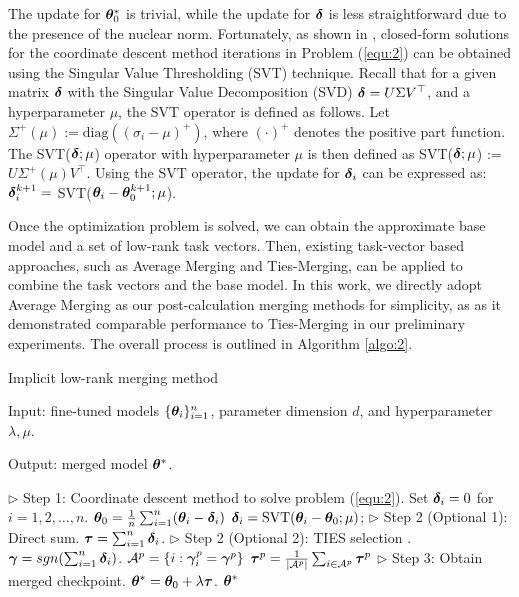 The update for $\bm{\theta}_0^*$ is trivial, while the update for $\bm{\delta}$ is less straightforward due to the presence of the nuclear norm.
Fortunately, as shown in \citet{cai_2010_singular}, closed-form solutions for the coordinate descent method iterations in Problem (\ref{equ:2}) can be obtained using the Singular Value Thresholding (SVT) technique.
Recall that for a given matrix $\bm{\delta}$ with the Singular Value Decomposition (SVD) $\bm{\delta} = U \Sigma V^\top$, and a hyperparameter $\mu$, the SVT operator is defined as follows.
Let $\Sigma^+(\mu) := \text{diag}((\sigma_i - \mu)^+)$, where $(\cdot)^+$ denotes the positive part function. The SVT($\bm{\delta}; \mu$) operator with hyperparameter $\mu$ is then defined as SVT($\bm{\delta}; \mu$) := $U \Sigma^+ (\mu) V^\top$.
Using the SVT operator, the update for $\bm{\delta}_i$ can be expressed as:
$\bm{\delta}_i^{k+1} = $ SVT($\bm{\theta}_i - \bm{\theta}_0^{k+1}; \mu$).

Once the optimization problem is solved, we can obtain the approximate base model and a set of low-rank task vectors. Then, existing task-vector based approaches, such as Average Merging and Ties-Merging, can be applied to combine the task vectors and the base model. In this work, we directly adopt Average Merging as our post-calculation merging methods for simplicity, as as it demonstrated comparable performance to Ties-Merging in our preliminary experiments. The overall process is outlined in Algorithm \ref{algo:2}.


\begin{algorithm}[t!]

\caption{Implicit low-rank merging method}
\label{algo:2}

Input: fine-tuned models $\{ \bm{\theta}_i \}_{i=1}^n$, parameter dimension $d$, and hyperparameter $\lambda, \mu$.

Output: merged model $\bm{\theta}^*$.

\begin{algorithmic}
\STATE $\rhd$ Step 1: Coordinate descent method to solve problem (\ref{equ:2}).
\STATE Set $\bm{\delta}_i = 0$ for $i = 1, 2, \dots, n$.
\STATE $\bm{\theta}_0 = \frac{1}{n} \sum_{i=1}^n (\bm{\theta}_i - \bm{\delta}_i)$
\STATE $\bm{\delta}_i = \mathrm{SVT} (\bm{\theta}_i - \bm{\theta}_0; \mu)$;
\ENDFOR 
\ENDWHILE
\STATE
\STATE $\rhd$ Step 2 (Optional 1): Direct sum.
\STATE $\bm{\tau} = \sum_{i=1}^n \bm{\delta}_i$.
\STATE
\STATE $\rhd$ Step 2 (Optional 2): TIES selection \citep{yadav_2024_ties}.
\STATE $\bm{\gamma} = sgn(\sum_{i=1}^n \bm{\delta}_i)$.
\STATE $\mathcal{A}^p = \{i:  \bm{\gamma}_i^p = \bm{\gamma}^p \}$
\STATE $\bm{\tau}^p = \frac{1}{|\mathcal{A}^p|} \sum_{i \in \mathcal{A}^p} \bm{\tau}^p$
\ENDFOR
\STATE
\STATE $\rhd$ Step 3: Obtain merged checkpoint.
\STATE $\bm{\theta}^* = \bm{\theta}_0 + \lambda \bm{\tau}$.
\RETURN $\bm{\theta}^*$
\end{algorithmic}

\end{algorithm}


